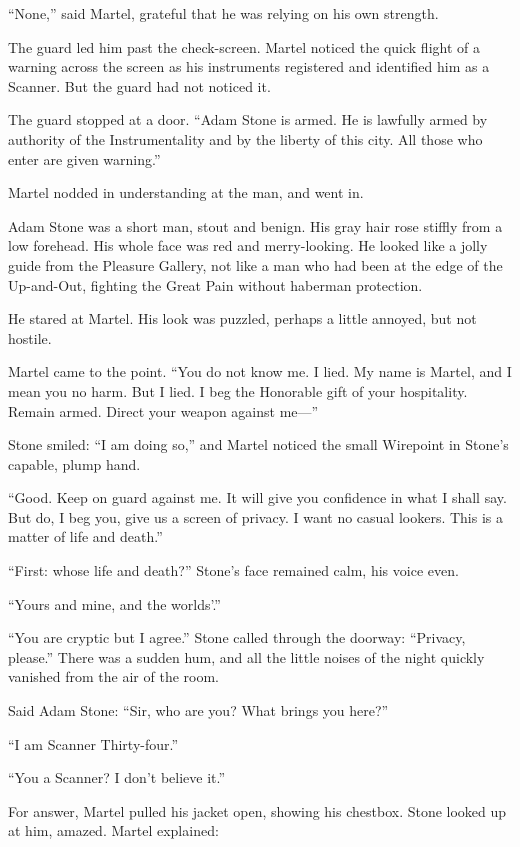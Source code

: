 ``None,'' said Martel, grateful that he was relying on his own strength.

The guard led him past the check-screen. Martel noticed the quick flight of a warning across the screen as his instruments registered and identified him as a Scanner. But the guard had not noticed it.

The guard stopped at a door. ``Adam Stone is armed. He is lawfully armed by authority of the Instrumentality and by the liberty of this city. All those who enter are given warning.''

Martel nodded in understanding at the man, and went in.

Adam Stone was a short man, stout and benign. His gray hair rose stiffly from a low forehead. His whole face was red and merry-looking. He looked like a jolly guide from the Pleasure Gallery, not like a man who had been at the edge of the Up-and-Out, fighting the Great Pain without haberman protection.

He stared at Martel. His look was puzzled, perhaps a little annoyed, but not hostile.

Martel came to the point. ``You do not know me. I lied. My name is Martel, and I mean you no harm. But I lied. I beg the Honorable gift of your hospitality. Remain armed. Direct your weapon against me---''

Stone smiled: ``I am doing so,'' and Martel noticed the small Wirepoint in Stone's capable, plump hand.

``Good. Keep on guard against me. It will give you confidence in what I shall say. But do, I beg you, give us a screen of privacy. I want no casual lookers. This is a matter of life and death.''

``First: whose life and death?'' Stone's face remained calm, his voice even.

``Yours and mine, and the worlds'.''

``You are cryptic but I agree.'' Stone called through the doorway: ``Privacy, please.'' There was a sudden hum, and all the little noises of the night quickly vanished from the air of the room.

Said Adam Stone: ``Sir, who are you? What brings you here?''

``I am Scanner Thirty-four.''

``You a Scanner? I don't believe it.''

For answer, Martel pulled his jacket open, showing his chestbox. Stone looked up at him, amazed. Martel explained:


